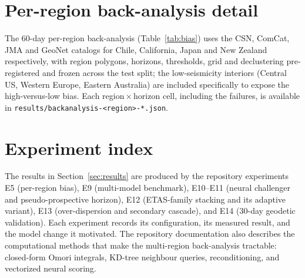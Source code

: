 \documentclass[journal]{IEEEtran}
\begin{document}
\appendices
\section{Per-region back-analysis detail}
The 60-day per-region back-analysis (Table~\ref{tab:bias}) uses the CSN, ComCat, JMA and GeoNet
catalogs for Chile, California, Japan and New Zealand respectively, with region polygons,
horizons, thresholds, grid and declustering pre-registered and frozen across the test split;
the low-seismicity interiors (Central US, Western Europe, Eastern Australia) are included
specifically to expose the high-versus-low bias. Each region\,$\times$\,horizon cell, including
the failures, is available in \texttt{results/backanalysis-<region>-*.json}.

\section{Experiment index}
The results in Section~\ref{sec:results} are produced by the repository experiments E5
(per-region bias), E9 (multi-model benchmark), E10--E11 (neural challenger and
pseudo-prospective horizon), E12 (ETAS-family stacking and its adaptive variant), E13
(over-dispersion and secondary cascade), and E14 (30-day geodetic validation). Each experiment
records its configuration, its measured result, and the model change it motivated. The
repository documentation also describes the computational methods that make the multi-region
back-analysis tractable: closed-form Omori integrals, KD-tree neighbour queries,
reconditioning, and vectorized neural scoring.
\end{document}
